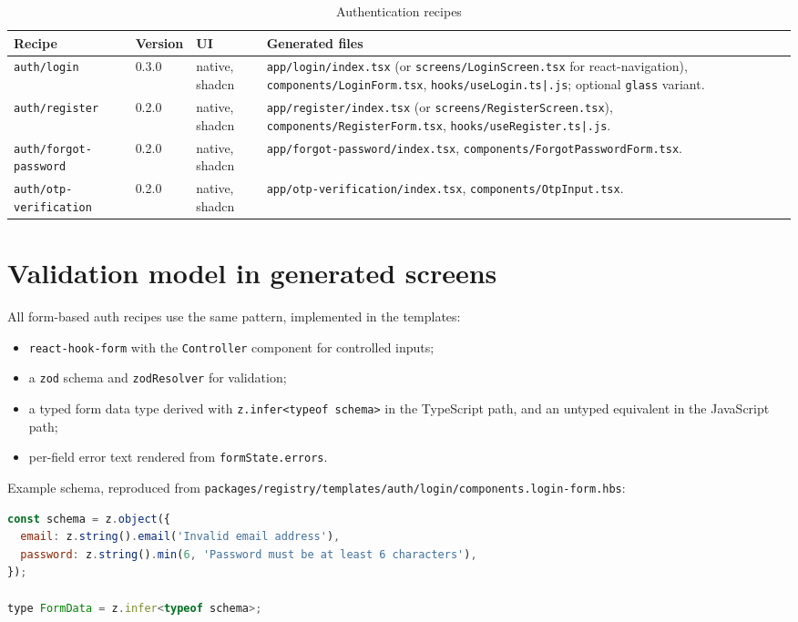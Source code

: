 \begin{longtable}{p{3.6cm}p{1.5cm}p{1.9cm}p{7.4cm}}
\caption{Authentication recipes}\\
\toprule
\textbf{Recipe} & \textbf{Version} & \textbf{UI} & \textbf{Generated files} \\
\midrule

\texttt{auth/login} & 0.3.0 & native, shadcn & \texttt{app/login/index.tsx} (or
\texttt{screens/LoginScreen.tsx} for react-navigation),
\texttt{components/LoginForm.tsx}, \texttt{hooks/useLogin.ts|.js}; optional
\texttt{glass} variant. \\
\texttt{auth/register} & 0.2.0 & native, shadcn & \texttt{app/register/index.tsx} (or
\texttt{screens/RegisterScreen.tsx}), \texttt{components/RegisterForm.tsx},
\texttt{hooks/useRegister.ts|.js}. \\
\texttt{auth/forgot-password} & 0.2.0 & native, shadcn &
\texttt{app/forgot-password/index.tsx},
\texttt{components/ForgotPasswordForm.tsx}. \\
\texttt{auth/otp-verification} & 0.2.0 & native, shadcn &
\texttt{app/otp-verification/index.tsx}, \texttt{components/OtpInput.tsx}. \\
\bottomrule
\end{longtable}

\section{Validation model in generated screens}

All form-based auth recipes use the same pattern, implemented in the templates:

\begin{itemize}
  \item \texttt{react-hook-form} with the \texttt{Controller} component for
        controlled inputs;
  \item a \texttt{zod} schema and \texttt{zodResolver} for validation;
  \item a typed form data type derived with \texttt{z.infer<typeof schema>} in the
        TypeScript path, and an untyped equivalent in the JavaScript path;
  \item per-field error text rendered from \texttt{formState.errors}.
\end{itemize}

Example schema, reproduced from
\texttt{packages/registry/templates/auth/login/components.login-form.hbs}:

\begin{lstlisting}[language=JavaScript]
const schema = z.object({
  email: z.string().email('Invalid email address'),
  password: z.string().min(6, 'Password must be at least 6 characters'),
});

type FormData = z.infer<typeof schema>;
\end{lstlisting}

